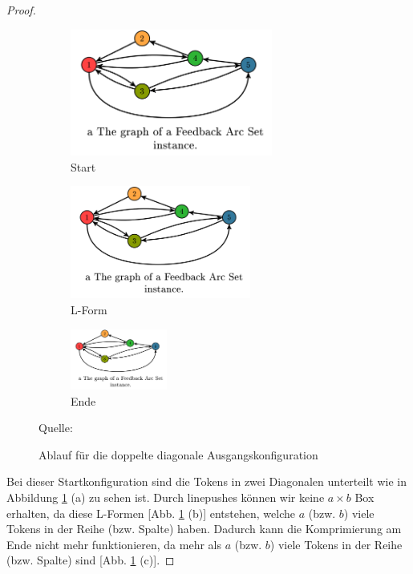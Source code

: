 \documentclass[seminar,german]{algothesis}
\newcommand*{\quelle}{%
  \footnotesize Quelle:
}
\begin{document}
\begin{proof}
\begin{figure}[ht]
	\centering
	\begin{subfigure}{.3\textwidth}
		\includegraphics[width=0.73\textwidth]{graph}
		\caption{Start}
    \end{subfigure}%
    \begin{subfigure}{.3\textwidth}
		\includegraphics[width=0.65\textwidth]{graph}
		\caption{L-Form}
    \end{subfigure}%
    \begin{subfigure}{.3\textwidth}
		\includegraphics[width=0.35\textwidth]{graph}
		\caption{Ende}
    \end{subfigure}%
    \caption{Ablauf für die doppelte diagonale Ausgangskonfiguration}
	\quelle \cite{akitaya2022pushing}
	\label{fig:13}
\end{figure}

\noindent
Bei dieser Startkonfiguration sind die Tokens in zwei Diagonalen unterteilt wie in Abbildung \ref{fig:13} (a) zu sehen ist. Durch linepushes können wir keine $a\times b$ Box erhalten, da diese L-Formen [Abb. \ref{fig:13} (b)] entstehen, welche $a$ (bzw. $b$) viele Tokens in der Reihe (bzw. Spalte) haben. Dadurch kann die Komprimierung am Ende nicht mehr funktionieren, da mehr als $a$ (bzw. $b$) viele Tokens in der Reihe (bzw. Spalte) sind [Abb. \ref{fig:13} (c)].
\end{proof}
\end{document}
